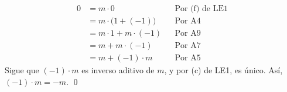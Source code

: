 \documentclass[11pt]{article}
\begin{document}
\begin{enumerate}[label=\alph*)]
\begin{align*}
        0 &= m \cdot 0 && \text{Por (f) de LE1}\\
        &= m \cdot \bigl(1+(-1)\bigr) && \text{Por A4}\\
        &= m \cdot 1 + m \cdot (-1)  && \text{Por A9}\\
        &= m + m \cdot (-1)  && \text{Por A7}\\
        &= m + (-1) \cdot m  && \text{Por A5}
    \end{align*} Sigue que $(-1) \cdot m$ es inverso aditivo de $m$, y por (c) de LE1, es único. Así, $(-1) \cdot m = -m$. \qed



\end{enumerate}
\end{document}
